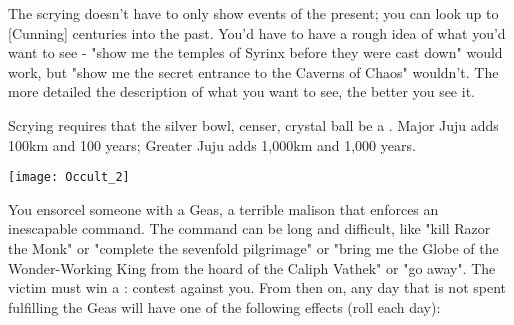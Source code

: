 {The scrying doesn't have to only show events of the present; you can look up to [Cunning] centuries into the past.  You'd have to have a rough idea of what you'd want to see - "show me the temples of Syrinx before they were cast down" would work, but "show me the secret entrance to the Caverns of Chaos" wouldn't.  The more detailed the description of what you want to see, the better you see it.

Scrying requires that the silver bowl, censer, crystal ball be a .  Major Juju adds 100km and 100 years; Greater Juju adds 1,000km and 1,000 years.

  \begin{center}
  \texttt{[image: Occult\_2]}
  \end{center}



\OCCULT[
  Name=Geas,
  Link=occultism-geas,
  Success=12,
  Cost=666\AU
]


You ensorcel someone with a Geas, a terrible malison that enforces an inescapable command. The command can be long and difficult, like "kill Razor the Monk" or "complete the sevenfold pilgrimage" or "bring me the Globe of the Wonder-Working King from the hoard of the Caliph Vathek" or "go away". The victim must win a \RB : \FOC contest against you.  From then on, any day that is not spent fulfilling the Geas will have one of the following effects (roll each day):


}
